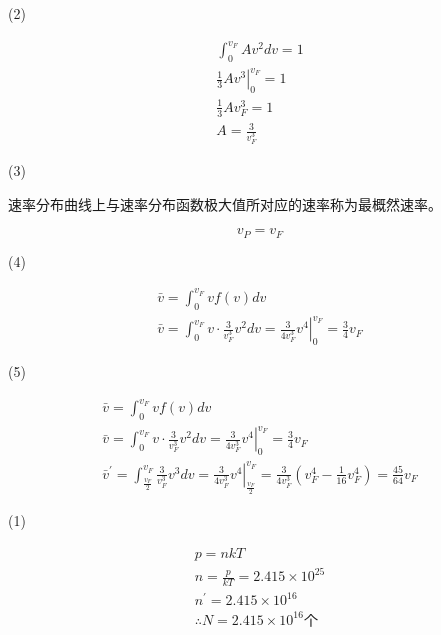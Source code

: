 \documentclass[b5paper,opensource]{./template/qyxf-book}
\begin{document}
(2)

$$
\begin{array} { c }
 { \int _ { 0 } ^ { v _ { F } } A v ^ { 2 } d v = 1 } \\ { \left. \frac { 1 } { 3 } A v ^ { 3 } \right| _ { 0 } ^ { v _ { F } } = 1 } \\ { \frac { 1 } { 3 } A v _ { F } ^ { 3 } = 1 } \\ { A = \frac { 3 } { v _ { F } ^ { 3 } } }
 \end{array}
$$

(3)

速率分布曲线上与速率分布函数极大值所对应的速率称为最概然速率。

$$ v_P=v_F $$

(4)

$$
\begin{array} { c } 
{ \bar { v } = \int _ { 0 } ^ { v _ { F } } v f ( v ) d v } \\ { \bar { v } = \int _ { 0 } ^ { v _ { F } } v \cdot \frac { 3 } { v _ { F } ^ { 3 } } v ^ { 2 } d v = \left. \frac { 3 } { 4 v _ { F } ^ { 3 } } v ^ { 4 } \right| _ { 0 } ^ { v _ { F } } = \frac { 3 } { 4 } v _ { F } } 
\end{array}
$$

(5)

$$
\begin{array} { c }
 { \bar { v } = \int _ { 0 } ^ { v _ { F } } v f ( v ) d v } \\
{ \bar { v } = \int _ { 0 } ^ { v _ { F } } v \cdot \frac { 3 } { v _ { F } ^ { 3 } } v ^ { 2 } d v = \left. \frac { 3 } { 4 v _ { F } ^ { 3 } } v ^ { 4 } \right| _ { 0 } ^ { v _ { F } } = \frac { 3 } { 4 } v _ { F } } \\ { \bar { v } ^ { \prime } = \int _ { \frac { v _ { F } } { 2 } } ^ { v _ { F } } \frac { 3 } { v _ { F } ^ { 3 } } v ^ { 3 } d v = \left. \frac { 3 } { 4 v _ { F } ^ { 3 } } v ^ { 4 } \right| _ { \frac { v _ { F } } { 2 } } ^ { v _ { F } } = \frac { 3 } { 4 v _ { F } ^ { 3 } } \left( v _ { F } ^ { 4 } - \frac { 1 } { 16 } v _ { F } ^ { 4 } \right) = \frac { 45 } { 64 } v _ { F } }
\end{array}
$$


\solve
(1)

$$
\begin{array} { c } { p = n k T } \\ 
{ n = \frac { p } { k T } = 2.415 \times 10 ^ { 25 } } \\ 
{ n ^ { \prime } = 2.415 \times 10 ^ { 16 } } \\
 { \therefore N = 2.415 \times 10 ^ { 16 } \mbox{个} } 
\end{array}
$$
\end{document}
